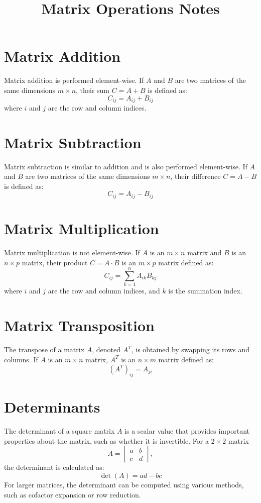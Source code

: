 \documentclass{article}
\title{\vspace{-2cm}Matrix Operations Notes}
\author{}
\date{}
\begin{document}
\maketitle

\section{Matrix Addition}
Matrix addition is performed element-wise. If \( A \) and \( B \) are two matrices of the same dimensions \( m \times n \), their sum \( C = A + B \) is defined as:
\[
C_{ij} = A_{ij} + B_{ij}
\]
where \( i \) and \( j \) are the row and column indices.

\section{Matrix Subtraction}
Matrix subtraction is similar to addition and is also performed element-wise. If \( A \) and \( B \) are two matrices of the same dimensions \( m \times n \), their difference \( C = A - B \) is defined as:
\[
C_{ij} = A_{ij} - B_{ij}
\]

\section{Matrix Multiplication}
Matrix multiplication is not element-wise. If \( A \) is an \( m \times n \) matrix and \( B \) is an \( n \times p \) matrix, their product \( C = A \cdot B \) is an \( m \times p \) matrix defined as:
\[
C_{ij} = \sum_{k=1}^{n} A_{ik} B_{kj}
\]
where \( i \) and \( j \) are the row and column indices, and \( k \) is the summation index.

\section{Matrix Transposition}
The transpose of a matrix \( A \), denoted \( A^T \), is obtained by swapping its rows and columns. If \( A \) is an \( m \times n \) matrix, \( A^T \) is an \( n \times m \) matrix defined as:
\[
(A^T)_{ij} = A_{ji}
\]

\section{Determinants}
The determinant of a square matrix \( A \) is a scalar value that provides important properties about the matrix, such as whether it is invertible. For a \( 2 \times 2 \) matrix 
\[
A = \begin{bmatrix}
a & b \\
c & d
\end{bmatrix},
\]
the determinant is calculated as:
\[
\det(A) = ad - bc
\]
For larger matrices, the determinant can be computed using various methods, such as cofactor expansion or row reduction.
\end{document}
